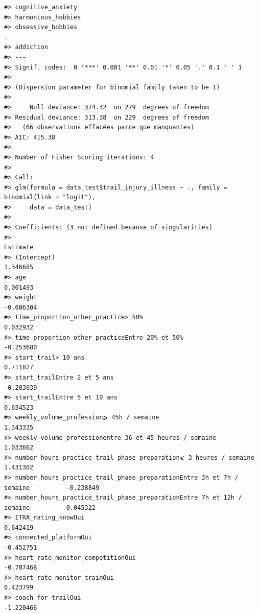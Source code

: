 \documentclass[
]{article}
\begin{document}
\begin{verbatim}
#> cognitive_anxiety                                                                
#> harmonious_hobbies                                                               
#> obsessive_hobbies                                                              . 
#> addiction                                                                        
#> ---
#> Signif. codes:  0 '***' 0.001 '**' 0.01 '*' 0.05 '.' 0.1 ' ' 1
#> 
#> (Dispersion parameter for binomial family taken to be 1)
#> 
#>     Null deviance: 374.32  on 279  degrees of freedom
#> Residual deviance: 313.38  on 229  degrees of freedom
#>   (66 observations effacées parce que manquantes)
#> AIC: 415.38
#> 
#> Number of Fisher Scoring iterations: 4
#> 
#> Call:
#> glm(formula = data_test$trail_injury_illness ~ ., family = binomial(link = "logit"), 
#>     data = data_test)
#> 
#> Coefficients: (3 not defined because of singularities)
#>                                                                                 Estimate
#> (Intercept)                                                                     1.346685
#> age                                                                             0.001493
#> weight                                                                         -0.006304
#> time_proportion_other_practice> 50%                                             0.032932
#> time_proportion_other_practiceEntre 20% et 50%                                 -0.253680
#> start_trail> 10 ans                                                             0.711827
#> start_trailEntre 2 et 5 ans                                                    -0.283039
#> start_trailEntre 5 et 10 ans                                                    0.654523
#> weekly_volume_profession⩾ 45h / semaine                                         1.343335
#> weekly_volume_professionentre 36 et 45 heures / semaine                         1.033662
#> number_hours_practice_trail_phase_preparation⩽ 3 heures / semaine               1.431302
#> number_hours_practice_trail_phase_preparationEntre 3h et 7h / semaine          -0.238849
#> number_hours_practice_trail_phase_preparationEntre 7h et 12h / semaine         -0.045322
#> ITRA_rating_knowOui                                                             0.642419
#> connected_platformOui                                                          -0.452751
#> heart_rate_monitor_competitionOui                                              -0.707468
#> heart_rate_monitor_trainOui                                                     0.423799
#> coach_for_trailOui                                                             -1.220466

\end{verbatim}
\end{document}
